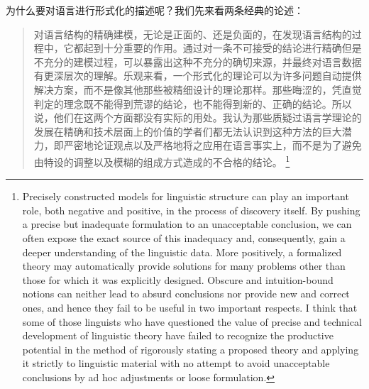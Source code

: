 为什么要对语言进行形式化的描述呢？我们先来看两条经典的论述：
\begin{quotation}
\label{quote-Chomsky-Formalisierung}%
对语言结构的精确建模，无论是正面的、还是负面的，在发现语言结构的过程中，它都起到十分重要的作用。通过对一条不可接受的结论进行精确但是不充分的建模过程，可以暴露出这种不充分的确切来源，并最终对语言数据有更深层次的理解。乐观来看，一个形式化的理论可以为许多问题自动提供解决方案，而不是像其他那些被精细设计的理论那样。那些晦涩的，凭直觉判定的理念既不能得到荒谬的结论，也不能得到新的、正确的结论。所以说，他们在这两个方面都没有实际的用处。我认为那些质疑过语言学理论的发展在精确和技术层面上的价值的学者们都无法认识到这种方法的巨大潜力，即严密地论证观点以及严格地将之应用在语言事实上，而不是为了避免由特设的调整以及模糊的组成方式造成的不合格的结论。
\citep[]{Chomsky57a}\footnote{%
Precisely constructed models for linguistic structure can play an
important role, both negative and positive, in the process of discovery 
itself. By pushing a precise but inadequate formulation to
an unacceptable conclusion, we can often expose the exact source
of this inadequacy and, consequently, gain a deeper understanding
of the linguistic data. More positively, a formalized theory may 
automatically provide solutions for many problems other than those
for which it was explicitly designed. Obscure and intuition-bound
notions can neither lead to absurd conclusions nor provide new and
correct ones, and hence they fail to be useful in two important respects. 
I think that some of those linguists who have questioned
the value of precise and technical development of linguistic theory
have failed to recognize the productive potential in the method
of rigorously stating a proposed theory and applying it strictly to
linguistic material with no attempt to avoid unacceptable conclusions 
by ad hoc adjustments or loose formulation.}
\end{quotation}


